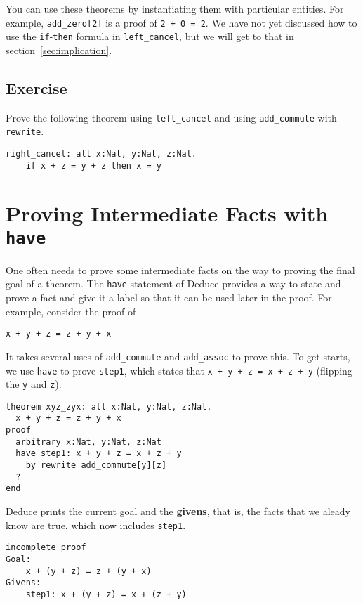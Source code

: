 \documentclass[12pt]{article}
\begin{document}
You can use these theorems by instantiating them with particular
entities. For example, \texttt{add\_zero[2]} is a proof of \texttt{2 +
  0 = 2}.  We have not yet discussed how to use the
\texttt{if}-\texttt{then} formula in \texttt{left\_cancel}, but we
will get to that in section~\ref{sec:implication}.

\subsection*{Exercise}

Prove the following theorem using \texttt{left\_cancel} and using
\texttt{add\_commute} with \texttt{rewrite}.

\begin{verbatim}
right_cancel: all x:Nat, y:Nat, z:Nat.
    if x + z = y + z then x = y
\end{verbatim}

\pagebreak

\section{Proving Intermediate Facts with \texttt{have}}

One often needs to prove some intermediate facts on the way to proving
the final goal of a theorem. The \texttt{have} statement of Deduce provides a
way to state and prove a fact and give it a label so that it can be
used later in the proof. For example, consider the proof of

\begin{verbatim}
x + y + z = z + y + x
\end{verbatim}

It takes several uses of \texttt{add\_commute} and \texttt{add\_assoc}
to prove this.  To get starts, we use \texttt{have} to prove
\texttt{step1}, which states that \texttt{x + y + z = x + z + y}
(flipping the \texttt{y} and \texttt{z}).

\begin{verbatim}
theorem xyz_zyx: all x:Nat, y:Nat, z:Nat.
  x + y + z = z + y + x
proof
  arbitrary x:Nat, y:Nat, z:Nat
  have step1: x + y + z = x + z + y
    by rewrite add_commute[y][z]
  ?
end
\end{verbatim}

Deduce prints the current goal and the \textbf{givens}, that is, the
facts that we aleady know are true, which now includes \texttt{step1}.

\begin{verbatim}
incomplete proof
Goal:
	x + (y + z) = z + (y + x)
Givens:
	step1: x + (y + z) = x + (z + y)
\end{verbatim}
\end{document}
